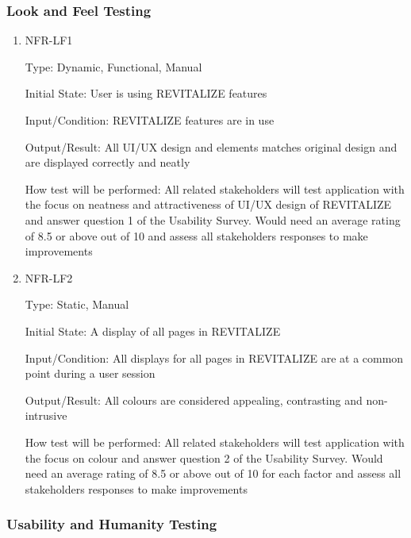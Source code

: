 \documentclass[12pt, titlepage]{article}
\begin{document}

\subsubsection{Look and Feel Testing}

\begin{enumerate}
	
	\item{NFR-LF1\\}
	
	Type: Dynamic, Functional, Manual
	
	Initial State: User is using REVITALIZE features
	
	Input/Condition: REVITALIZE features are in use
	
	Output/Result: All UI/UX design and elements matches original design and are displayed correctly and neatly
	
	How test will be performed: All related stakeholders will test application with the focus on neatness and attractiveness of UI/UX design of REVITALIZE and answer question 1 of the Usability Survey. Would need an average rating of 8.5 or above out of 10 and assess all stakeholders responses to make improvements
	
	\item{NFR-LF2\\}
	
	Type: Static, Manual
	
	Initial State: A display of all pages in REVITALIZE
	
	Input/Condition: All displays for all pages in REVITALIZE are at a common point during a user session
	
	Output/Result: All colours are considered appealing, contrasting and non-intrusive
	
	How test will be performed: All related stakeholders will test application with the focus on colour and answer question 2 of the Usability Survey. Would need an average rating of 8.5 or above out of 10 for each factor and assess all stakeholders responses to make improvements
	
\end{enumerate}

\subsubsection{Usability and Humanity Testing}
\end{document}
